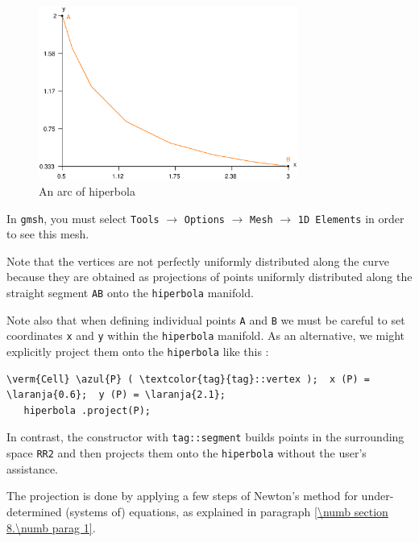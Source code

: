 \begin{figure}[ht] \centering
  \includegraphics[width=85mm]{hiperbola}
  \caption{An arc of hiperbola}
  \label{\numb section 2.\numb fig 4}
\end{figure}

In {\tt gmsh}, you must select {\small\tt Tools} $\to$ {\small\tt Options} $\to$
{\small\tt Mesh} $\to$ {\small\tt 1D Elements} in order to see this mesh.

Note that the vertices are not perfectly uniformly distributed along the curve
because they are obtained as projections of points uniformly distributed along
the straight segment {\small\tt AB} onto the {\small\tt hiperbola} manifold.

Note also that when defining individual points {\small\tt A} and {\small\tt B} we must
be careful to set coordinates {\small\tt x} and {\small\tt y} within
the {\small\tt hiperbola} manifold.
As an alternative, we might explicitly project them onto the {\small\tt hiperbola} like this :

\begin{Verbatim}[commandchars=\\\{\},formatcom=\small\tt,baselinestretch=0.94]
   \verm{Cell} \azul{P} ( \textcolor{tag}{tag}::vertex );  x (P) = \laranja{0.6};  y (P) = \laranja{2.1};
   hiperbola .project(P);
\end{Verbatim}

\noindent In contrast, the {\small\tt{}} constructor with {\small\tt \textcolor{tag}{tag}::segment}
builds points in the surrounding space {\small\tt RR2} and then projects them onto the
{\small\tt hiperbola} without the user's assistance.

The projection is done by applying a few steps of Newton's method for under-determined
(systems of) equations, as explained in paragraph \ref{\numb section 8.\numb parag 1}.

